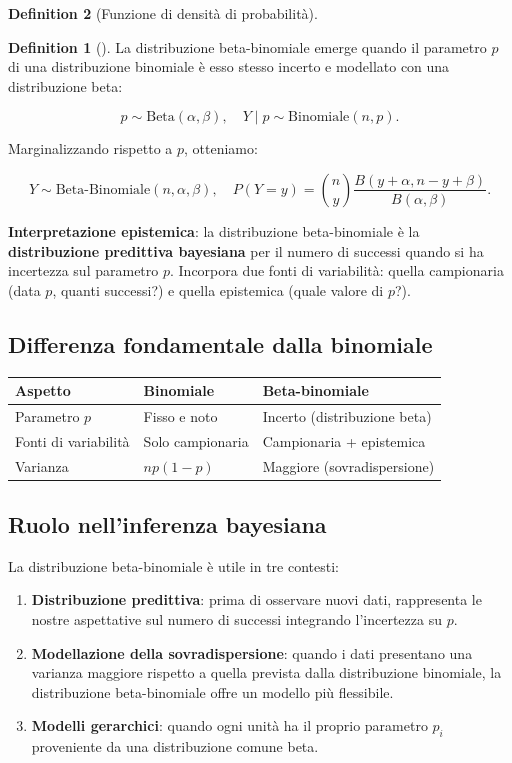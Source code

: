 \documentclass[
  letterpaper,
  DIV=11,
  numbers=noendperiod,
  oneside]{scrreprt}
\theoremstyle{definition}
\theoremstyle{plain}
\theoremstyle{definition}
\newtheorem{definition}{Definition}[chapter]
\theoremstyle{remark}
\begin{document}
\begin{definition}[Funzione di densità di
probabilità]
\begin{definition}[]
La distribuzione beta-binomiale emerge quando il parametro \(p\) di una
distribuzione binomiale è esso stesso incerto e modellato con una
distribuzione beta:

\[
p \sim \text{Beta}(\alpha, \beta), \quad Y \mid p \sim \text{Binomiale}(n, p).
\]

Marginalizzando rispetto a \(p\), otteniamo:

\[
Y \sim \text{Beta-Binomiale}(n, \alpha, \beta), \quad P(Y = y) = \binom{n}{y} \frac{B(y + \alpha, n - y + \beta)}{B(\alpha, \beta)}.
\]

\end{definition}

\textbf{Interpretazione epistemica}: la distribuzione beta-binomiale è
la \textbf{distribuzione predittiva bayesiana} per il numero di successi
quando si ha incertezza sul parametro \(p\). Incorpora due fonti di
variabilità: quella campionaria (data \(p\), quanti successi?) e quella
epistemica (quale valore di \(p\)?).

\subsection{Differenza fondamentale dalla
binomiale}\label{differenza-fondamentale-dalla-binomiale}

\begin{longtable}[]{@{}lll@{}}
\toprule\noalign{}
Aspetto & Binomiale & Beta-binomiale \\
\midrule\noalign{}
\endhead
\bottomrule\noalign{}
\endlastfoot
Parametro \(p\) & Fisso e noto & Incerto (distribuzione beta) \\
Fonti di variabilità & Solo campionaria & Campionaria + epistemica \\
Varianza & \(np(1-p)\) & Maggiore (sovradispersione) \\
\end{longtable}

\subsection{Ruolo nell'inferenza
bayesiana}\label{ruolo-nellinferenza-bayesiana-4}

La distribuzione beta-binomiale è utile in tre contesti:

\begin{enumerate}
\def\labelenumi{\arabic{enumi}.}
\item
  \textbf{Distribuzione predittiva}: prima di osservare nuovi dati,
  rappresenta le nostre aspettative sul numero di successi integrando
  l'incertezza su \(p\).
\item
  \textbf{Modellazione della sovradispersione}: quando i dati presentano
  una varianza maggiore rispetto a quella prevista dalla distribuzione
  binomiale, la distribuzione beta-binomiale offre un modello più
  flessibile.
\item
  \textbf{Modelli gerarchici}: quando ogni unità ha il proprio parametro
  \(p_i\) proveniente da una distribuzione comune beta.
\end{enumerate}


\end{definition}
\end{document}
